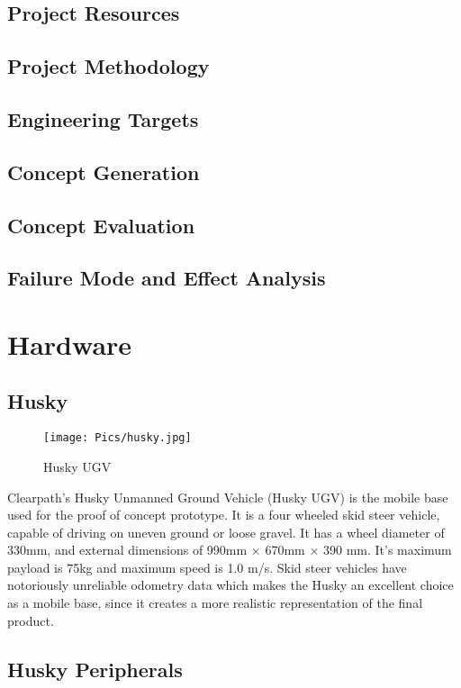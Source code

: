 \subsection{Project Resources}
\subsection{Project Methodology}
\subsection{Engineering Targets}
\subsection{Concept Generation}
\subsection{Concept Evaluation}
\subsection{Failure Mode and Effect Analysis}
\section{Hardware}
\subsection{Husky}
\begin{figure}[H]
    \centering
    \texttt{[image: Pics/husky.jpg]}
    \caption{Husky UGV \cite{huskypage}}
    \label{fig:husky}
\end{figure}
Clearpath's Husky Unmanned Ground Vehicle (Husky UGV) is the mobile base used for the proof of concept prototype. It is a four wheeled skid steer vehicle, capable of driving on uneven ground or loose gravel. It has a wheel diameter of 330mm, and external dimensions of 990mm $\times$ 670mm $\times$ 390 mm. It's maximum payload is 75kg and maximum speed is 1.0 m/s. Skid steer vehicles have notoriously unreliable odometry data which makes the Husky an excellent choice as a mobile base, since it creates a more realistic representation of the final product.\\
\subsection{Husky Peripherals}

